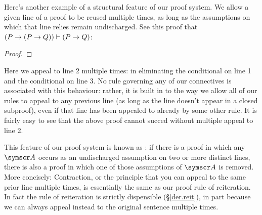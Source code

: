 Here's another example of a structural feature of our proof system. We allow a given line of a proof to be reused multiple times, as long as the assumptions on which that line relies remain undischarged. See this proof that $(P \rightarrow(P \rightarrow Q)) \vdash (P\rightarrow Q)$: \begin{proof}
	\open
	\close
\end{proof} Here we appeal to line 2 multiple times: in eliminating the conditional on line 1 and the conditional on line 3. No rule governing any of our connectives is associated with this behaviour: rather, it is built in to the way we allow all of our rules to appeal to any previous line (as long as the line doesn't appear in a closed subproof), even if that line has been appealed to already by some other rule. It is fairly easy to see that the above proof cannot succed without multiple appeal to line 2.

This feature of our proof system is known as : if there is a proof in which any $\meta{A}$ occurs as an undischarged assumption on two or more distinct lines, there is also a proof in which one of those assumptions of $\meta{A}$ is removed. More concisely:  
Contraction, or the principle that you can appeal to the same prior line multiple times, is essentially the same as our proof rule of reiteration. In fact the rule of reiteration is strictly dispensible (§\ref{der.reit}), in part because we can always appeal instead to the original sentence multiple times.

